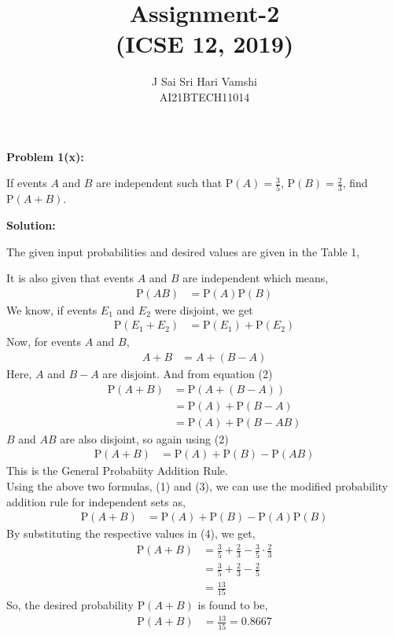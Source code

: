 \documentclass[journal,12pt,twocolumn]{article}\usepackage[margin=1.25 in]{geometry}
\title{\LARGE{\textbf{Assignment-2}\\(ICSE 12, 2019)}}
\author{\normalsize J Sai Sri Hari Vamshi\\ \footnotesize AI21BTECH11014}
\date{}
\providecommand{\pr}[1]{\ensuremath{\text{P}\left(#1\right)}}
\begin{document}
\maketitle
\begin{center}
    \textbf{\large Problem 1(x):}
\end{center}
\noindent If events $A$ and $B$ are independent such that $\pr{A} = \frac{3}{5}$, $\pr{B} = \frac{2}{3}$, find $\pr{A + B}$.

\begin{center}
    \textbf{\large Solution:}
\end{center}

\noindent The given input probabilities and desired values are given in the Table 1,
\begin{center}
\begin{table}[h!]
\label{table:table1}

\caption{}
\end{table}
\end{center}
\noindent It is also given that events $A$ and $B$ are independent which means,
\begin{align}
\pr{AB} & = \pr A \pr B
\end{align}
\noindent We know, if events $E_1$ and $E_2$ were disjoint, we get
\begin{align}
\pr{E_1 + E_2} & = \pr{E_1} + \pr{E_2}
\end{align}
\noindent Now, for events $A$ and $B$,
\begin{align*}
A + B & = A + (B - A)
\end{align*}
\noindent Here, $A$ and $B - A$ are disjoint. And from equation (2)
\begin{align*}
\pr{A + B} & = \pr{A + (B - A)}\\
& = \pr A + \pr{B - A}\\
& = \pr A + \pr{B - AB}
\end{align*}
\noindent $B$ and $AB$ are also disjoint, so again using (2)
\begin{align}
\pr{A + B} & = \pr A + \pr B - \pr{AB}
\end{align}
\noindent This is the General Probabiity Addition Rule.\\
\noindent Using the above two formulas, (1) and (3), we can use the modified probability addition rule for independent sets as,
\begin{align}
\pr{A + B} & = \pr A + \pr B - \pr A \pr B
\end{align}
\noindent By substituting the respective values in (4), we get,
\begin{align*}
\pr{A + B} & = \frac{3}{5} + \frac{2}{3} - \frac{3}{5} \cdot \frac{2}{3} \\
& = \frac{3}{5} + \frac{2}{3} - \frac{2}{5}\\
& = \frac{13}{15}
\end{align*}
\noindent So, the desired probability $\pr{A + B}$ is found to be,
\begin{align*}
\pr{A + B} & = \frac{13}{15} = 0.8667
\end{align*}
\end{document}
